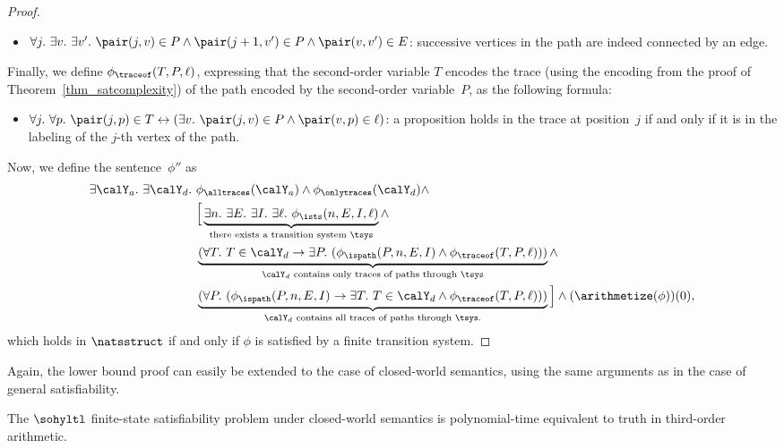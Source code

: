 \begin{proof}
\begin{itemize}
    \item $\forall j.\ \exists v.\ \exists v'.\ \pair(j,v) \in P \wedge \pair(j+1, v') \in P \wedge \pair(v,v') \in E $: successive vertices in the path are indeed connected by an edge.
\end{itemize}

Finally, we define $\phi_\traceof(T, P, \ell)$, expressing that the second-order variable $T$ encodes the trace (using the encoding from the proof of Theorem~\ref{thm_satcomplexity}) of the path encoded by the second-order variable~$P$, as the  following formula:
\begin{itemize}
    \item $\forall j.\ \forall p.\ \pair(j,p) \in T \leftrightarrow (\exists v.\ \pair(j,v) \in P \wedge \pair(v,p) \in \ell)$: a proposition holds in the trace at position~$j$ if and only if it is in the labeling of the $j$-th vertex of the path.
\end{itemize}

Now, we define the sentence~$\phi''$ as 
\begin{align*}
\exists \calY_a.\ \exists\calY_d.\ {}&{} \phi_\alltraces(\calY_a) \wedge \phi_\onlytraces(\calY_d) \wedge\\
%
&{}\Big[\underbrace{\exists n.\ \exists E.\ \exists I.\ \exists \ell.\ \phi_\ists(n, E, I, \ell)}_{\text{there exists a transition system~$\tsys$}} \wedge \\
&{}\underbrace{(\forall T.\ T \in \calY_d \rightarrow \exists P.\ (\phi_\ispath(P, n, E, I) \wedge \phi_\traceof(T,P, \ell)))}_{\text{$\calY_d$ contains only traces of paths through $\tsys$}}\wedge\\
%
&{}\underbrace{( \forall P.\ (\phi_\ispath(P, n,E,I) \rightarrow \exists T.\ T \in \calY_d \wedge \phi_\traceof(T,P, \ell)) )}_{\text{$\calY_d$ contains all traces of paths through $\tsys$.}}\Big]\wedge  (\arithmetize(\phi))(0),
\end{align*}
which holds in $\natsstruct$ if and only if $\phi$ is satisfied by a finite transition system.
\end{proof}

Again, the lower bound proof can easily be extended to the case of closed-world semantics, using the same arguments as in the case of general satisfiability.

\begin{cor}
\label{cor_finsatcomplexity_cw}
The $\sohyltl$ finite-state satisfiability problem under closed-world semantics is polynomial-time equivalent to truth in third-order arithmetic.
\end{cor}

